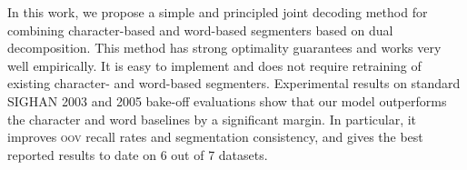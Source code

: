 In this work, we propose a simple and principled joint decoding method for combining character-based and word-based segmenters based on dual decomposition. This method has strong optimality guarantees and works very well empirically. It is easy to implement and does not require retraining of existing character- and word-based segmenters.
Experimental results on standard SIGHAN 2003 and 2005 bake-off evaluations show that our model outperforms the character and word baselines by a significant margin.
In particular, it improves \textsc{oov} recall rates and segmentation consistency, %
and gives the best reported results to date on 6 out of 7 datasets.